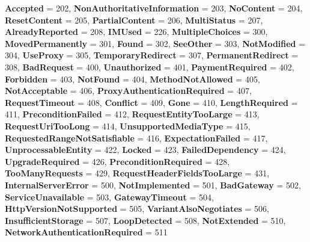 \begin{DoxyCompactItemize}
{\bfseries Accepted} = 202, 
{\bfseries Non\+Authoritative\+Information} = 203, 
\newline
{\bfseries No\+Content} = 204, 
{\bfseries Reset\+Content} = 205, 
{\bfseries Partial\+Content} = 206, 
{\bfseries Multi\+Status} = 207, 
\newline
{\bfseries Already\+Reported} = 208, 
{\bfseries I\+M\+Used} = 226, 
{\bfseries Multiple\+Choices} = 300, 
{\bfseries Moved\+Permanently} = 301, 
\newline
{\bfseries Found} = 302, 
{\bfseries See\+Other} = 303, 
{\bfseries Not\+Modified} = 304, 
{\bfseries Use\+Proxy} = 305, 
\newline
{\bfseries Temporary\+Redirect} = 307, 
{\bfseries Permanent\+Redirect} = 308, 
{\bfseries Bad\+Request} = 400, 
{\bfseries Unauthorized} = 401, 
\newline
{\bfseries Payment\+Required} = 402, 
{\bfseries Forbidden} = 403, 
{\bfseries Not\+Found} = 404, 
{\bfseries Method\+Not\+Allowed} = 405, 
\newline
{\bfseries Not\+Acceptable} = 406, 
{\bfseries Proxy\+Authentication\+Required} = 407, 
{\bfseries Request\+Timeout} = 408, 
{\bfseries Conflict} = 409, 
\newline
{\bfseries Gone} = 410, 
{\bfseries Length\+Required} = 411, 
{\bfseries Precondition\+Failed} = 412, 
{\bfseries Request\+Entity\+Too\+Large} = 413, 
\newline
{\bfseries Request\+Uri\+Too\+Long} = 414, 
{\bfseries Unsupported\+Media\+Type} = 415, 
{\bfseries Requested\+Range\+Not\+Satisfiable} = 416, 
{\bfseries Expectation\+Failed} = 417, 
\newline
{\bfseries Unprocessable\+Entity} = 422, 
{\bfseries Locked} = 423, 
{\bfseries Failed\+Dependency} = 424, 
{\bfseries Upgrade\+Required} = 426, 
\newline
{\bfseries Precondition\+Required} = 428, 
{\bfseries Too\+Many\+Requests} = 429, 
{\bfseries Request\+Header\+Fields\+Too\+Large} = 431, 
{\bfseries Internal\+Server\+Error} = 500, 
\newline
{\bfseries Not\+Implemented} = 501, 
{\bfseries Bad\+Gateway} = 502, 
{\bfseries Service\+Unavailable} = 503, 
{\bfseries Gateway\+Timeout} = 504, 
\newline
{\bfseries Http\+Version\+Not\+Supported} = 505, 
{\bfseries Variant\+Also\+Negotiates} = 506, 
{\bfseries Insufficient\+Storage} = 507, 
{\bfseries Loop\+Detected} = 508, 
\newline
{\bfseries Not\+Extended} = 510, 
{\bfseries Network\+Authentication\+Required} = 511

\end{DoxyCompactItemize}
